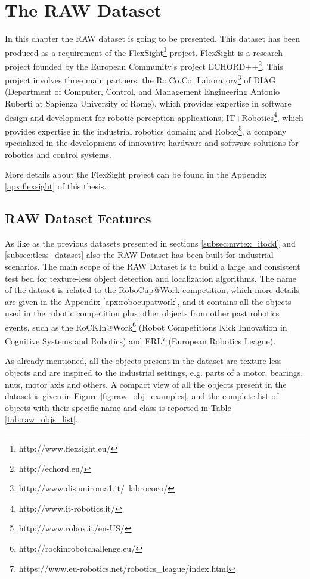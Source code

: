 \chapter{The RAW Dataset}\label{ch:benchmarks_and_metrics}
In this chapter the RAW dataset is going to be presented. This dataset has been produced as a requirement of the FlexSight\footnote{http://www.flexsight.eu/} project. FlexSight is a research project founded by the European Community's project ECHORD++\footnote{http://echord.eu/}.  This project involves three main partners: the Ro.Co.Co. Laboratory\footnote{http://www.dis.uniroma1.it/~labrococo/} of DIAG (Department of Computer, Control, and Management Engineering  Antonio Ruberti at Sapienza University of Rome), which provides expertise in software design and development for robotic perception applications; IT+Robotics\footnote{http://www.it-robotics.it/}, which provides expertise in the industrial robotics domain; and Robox\footnote{http://www.robox.it/en-US/}, a company specialized in the development of innovative hardware and software solutions for robotics and control systems. 

More details about the FlexSight project can be found in the Appendix \ref{apx:flexsight} of this thesis.

\section{RAW Dataset Features}\label{sec:raw_features}
As like as the previous datasets presented in sections \ref{subsec:mvtex_itodd} and \ref{subsec:tless_dataset} also the RAW Dataset has been built for industrial scenarios. The main scope of the RAW Dataset is to build a large and consistent test bed for texture-less object detection and localization algorithms. The name of the dataset is related to the RoboCup@Work competition, which more details are given in the Appendix \ref{apx:robocupatwork}, and it contains all the objects used in the robotic competition plus other objects from other past robotics events, such as the RoCKIn@Work\footnote{http://rockinrobotchallenge.eu/} (Robot Competitions Kick Innovation in Cognitive Systems and Robotics) and ERL\footnote{https://www.eu-robotics.net/robotics\_league/index.html} (European Robotics League). 

As already mentioned, all the objects present in the dataset are texture-less objects and are inspired to the industrial settings, e.g. parts of a motor, bearings, nuts, motor axis and others. A compact view of all the objects present in the dataset is given in Figure \ref{fig:raw_obj_examples}, and the complete list of objects with their specific name and class is reported in Table \ref{tab:raw_objs_list}.

